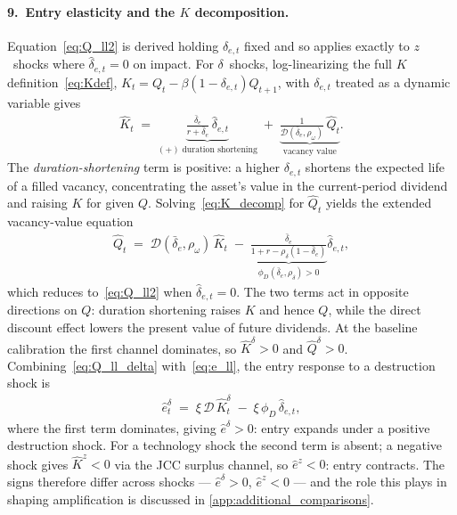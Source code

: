 \documentclass[authoryear, review, 12pt]{elsarticle}
\begin{document}
\paragraph{9.\ Entry elasticity and the $K$ decomposition.}
Equation~\eqref{eq:Q_ll2} is derived holding $\delta_{e,t}$ fixed and so
applies exactly to $z$~shocks where $\hat\delta_{e,t}=0$ on impact.
For $\delta$~shocks, log-linearizing the full $K$ definition~\eqref{eq:Kdef},
$K_t=Q_t-\beta(1-\delta_{e,t})Q_{t+1}$, with $\delta_{e,t}$ treated as a
dynamic variable gives
\begin{align}\label{eq:K_decomp}
    \hat{K}_t
    \;=\;
    \underbrace{\frac{\bar\delta_e}{r+\bar\delta_e}\,\hat\delta_{e,t}}_{\displaystyle(+)\;\text{duration shortening}}
    \;+\;
    \underbrace{\frac{1}{\mathcal{D}(\bar\delta_e,\rho_\omega)}\,\hat{Q}_t}_{\displaystyle\text{vacancy value}}.
\end{align}
The \emph{duration-shortening} term is positive: a higher $\delta_{e,t}$
shortens the expected life of a filled vacancy, concentrating the asset's
value in the current-period dividend and raising $K$ for given $Q$.
Solving~\eqref{eq:K_decomp} for $\hat{Q}_t$ yields the extended
vacancy-value equation
\begin{align}\label{eq:Q_ll_delta}
    \hat{Q}_t
    \;=\;
    \mathcal{D}(\bar\delta_e,\rho_\omega)\,\hat{K}_t
    \;-\;
    \underbrace{\frac{\bar\delta_e}{1+r-\rho_\delta(1-\bar\delta_e)}}_{\displaystyle\phi_D(\bar\delta_e,\rho_\delta)>0}
    \hat\delta_{e,t},
\end{align}
which reduces to~\eqref{eq:Q_ll2} when $\hat\delta_{e,t}=0$.
The two terms act in opposite directions on $Q$: duration shortening raises
$K$ and hence $Q$, while the direct discount effect lowers the present value
of future dividends.  At the baseline calibration the first channel
dominates, so $\hat{K}^\delta>0$ and $\hat{Q}^\delta>0$.
Combining~\eqref{eq:Q_ll_delta} with~\eqref{eq:e_ll}, the entry response
to a destruction shock is
\begin{align}\label{eq:e_ll_delta}
    \hat{e}_t^\delta
    \;=\;
    \xi\,\mathcal{D}\,\hat{K}_t^\delta
    \;-\;
    \xi\,\phi_D\,\hat\delta_{e,t},
\end{align}
where the first term dominates, giving $\hat{e}^\delta>0$: entry expands
under a positive destruction shock.  For a technology shock the second
term is absent; a negative shock gives $\hat{K}^z<0$ via the JCC surplus
channel, so $\hat{e}^z<0$: entry contracts.  The signs therefore differ
across shocks --- $\hat{e}^\delta>0$, $\hat{e}^z<0$ --- and the role this
plays in shaping amplification is discussed in
\ref{app:additional_comparisons}.
\end{document}
